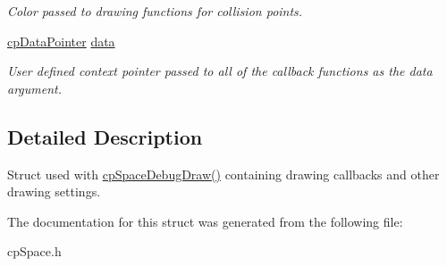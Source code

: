 \begin{DoxyCompactItemize}
\begin{DoxyCompactList}\small\item\em Color passed to drawing functions for collision points. \end{DoxyCompactList}\item 
\hypertarget{structcp_space_debug_draw_options_a68c76e73a9a75b589bb1d26925fcc3e4}{}\hyperlink{group__basic_types_ga2ac2c3c31e21893941f9e4f8ee279447}{cp\+Data\+Pointer} \hyperlink{structcp_space_debug_draw_options_a68c76e73a9a75b589bb1d26925fcc3e4}{data}\label{structcp_space_debug_draw_options_a68c76e73a9a75b589bb1d26925fcc3e4}

\begin{DoxyCompactList}\small\item\em User defined context pointer passed to all of the callback functions as the \textquotesingle{}data\textquotesingle{} argument. \end{DoxyCompactList}\end{DoxyCompactItemize}


\subsection{Detailed Description}
Struct used with \hyperlink{group__cp_space_gaa1233930591cb32d25852da2cbe76680}{cp\+Space\+Debug\+Draw()} containing drawing callbacks and other drawing settings. 

The documentation for this struct was generated from the following file\+:\begin{DoxyCompactItemize}
\item 
cp\+Space.\+h\end{DoxyCompactItemize}
